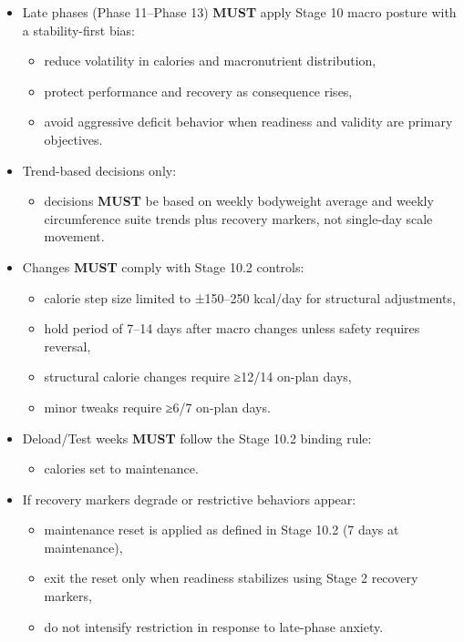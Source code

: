 \documentclass[10pt]{article}
\begin{document}
\begin{itemize}
\item Late phases (Phase 11–Phase 13) \textbf{MUST} apply Stage 10 macro posture with a stability-first bias:
\begin{itemize}
\item reduce volatility in calories and macronutrient distribution,
\item protect performance and recovery as consequence rises,
\item avoid aggressive deficit behavior when readiness and validity are primary objectives.
\end{itemize}
\item Trend-based decisions only:
\begin{itemize}
\item decisions \textbf{MUST} be based on weekly bodyweight average and weekly circumference suite trends plus recovery markers, not single-day scale movement.
\end{itemize}
\item Changes \textbf{MUST} comply with Stage 10.2 controls:
\begin{itemize}
\item calorie step size limited to ±150–250 kcal/day for structural adjustments,
\item hold period of 7–14 days after macro changes unless safety requires reversal,
\item structural calorie changes require ≥12/14 on-plan days,
\item minor tweaks require ≥6/7 on-plan days.
\end{itemize}
\item Deload/Test weeks \textbf{MUST} follow the Stage 10.2 binding rule:
\begin{itemize}
\item calories set to maintenance.
\end{itemize}
\item If recovery markers degrade or restrictive behaviors appear:
\begin{itemize}
\item maintenance reset is applied as defined in Stage 10.2 (7 days at maintenance),
\item exit the reset only when readiness stabilizes using Stage 2 recovery markers,
\item do not intensify restriction in response to late-phase anxiety.
\end{itemize}
\end{itemize}
\end{document}
